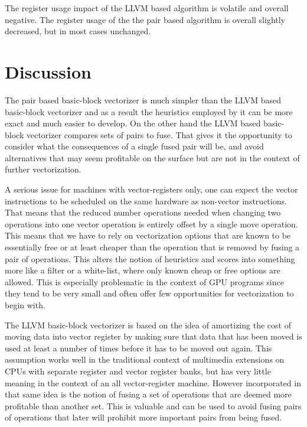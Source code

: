 \documentclass[12pt,a4paper,onecolumn,twoside,openright]{report}
\begin{document}
\begin{center}
\end{center}

The register usage impact of the LLVM based algorithm is volatile and overall negative.
The register usage of the the pair based algorithm is overall slightly decreased, but in most cases unchanged.


\chapter{Discussion}
 \label{chap:discussion}

The pair based basic-block vectorizer is much simpler than the LLVM based basic-block vectorizer and as a result the heuristics employed by it can be more exact and much easier to develop. On the other hand the LLVM based basic-block vectorizer compares sets of pairs to fuse. That gives it the opportunity to consider what the consequences of a single fused pair will be, and avoid alternatives that may seem profitable on the surface but are not in the context of further vectorization.


A serious issue for machines with vector-registers only, one can expect the vector instructions to be scheduled on the same hardware as non-vector instructions. That means that the reduced number operations needed when changing two operations into one vector operation is entirely offset by a single move operation. This means that we have to rely on vectorization options that are known to be essentially free or at least cheaper than the operation that is removed by fusing a pair of operations. This alters the notion of heuristics and scores into something more like a filter or a white-list, where only known cheap or free options are allowed. This is especially problematic in the context of GPU programs since they tend to be very small and often offer few opportunities for vectorization to begin with.


The LLVM basic-block vectorizer is based on the idea of amortizing the cost of moving data into vector register by making sure that data that has been moved is used at least a number of times before it has to be moved out again. This assumption works well in the traditional context of multimedia extensions on CPUs with separate register and vector register banks, but has very little meaning in the context of an all vector-register machine. However incorporated in that same idea is the notion of fusing a set of operations that are deemed more profitable than another set. This is valuable and can be used to avoid fusing pairs of operations that later will prohibit more important pairs from being fused.
\end{document}
